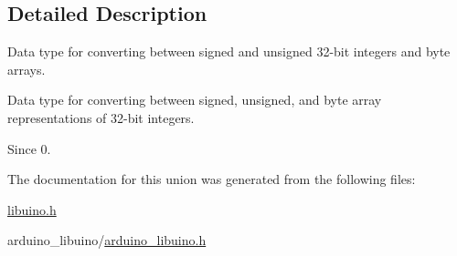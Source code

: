 \subsection{\-Detailed \-Description}
\-Data type for converting between signed and unsigned 32-\/bit integers and byte arrays. 

\-Data type for converting between signed, unsigned, and byte array representations of 32-\/bit integers.

\begin{DoxySince}{\-Since}
0. 
\end{DoxySince}


\-The documentation for this union was generated from the following files\-:\begin{DoxyCompactItemize}
\item 
\hyperlink{libuino_8h}{libuino.\-h}\item 
arduino\-\_\-libuino/\hyperlink{arduino__libuino_8h}{arduino\-\_\-libuino.\-h}\end{DoxyCompactItemize}
